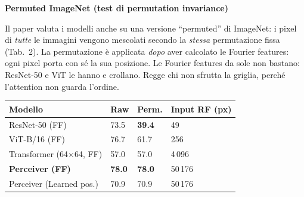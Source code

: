 \documentclass[
  11pt,
]{article}
\begin{document}
\textbf{Permuted ImageNet (test di permutation invariance)}

Il paper valuta i modelli anche su una versione ``permuted'' di ImageNet: i pixel di \emph{tutte} le immagini vengono mescolati secondo la \emph{stessa} permutazione fissa (Tab.\ 2). La permutazione è applicata \emph{dopo} aver calcolato le Fourier features: ogni pixel porta con sé la sua posizione. Le Fourier features da sole non bastano: ResNet-50 e ViT le hanno e crollano. Regge chi non sfrutta la griglia, perché l'attention non guarda l'ordine.

{\small
\begin{longtable}{@{}p{5cm} p{1.8cm} p{1.8cm} p{3cm}@{}}
\toprule
\textbf{Modello} & \textbf{Raw} & \textbf{Perm.} & \textbf{Input RF (px)} \\
\midrule
\endhead
ResNet-50 (FF) & 73.5 & \textbf{39.4} & 49 \\[2pt]
ViT-B/16 (FF) & 76.7 & 61.7 & 256 \\[2pt]
Transformer (64$\times$64, FF) & 57.0 & 57.0 & 4\,096 \\[2pt]
\textbf{Perceiver (FF)} & \textbf{78.0} & \textbf{78.0} & 50\,176 \\[2pt]
Perceiver (Learned pos.) & 70.9 & 70.9 & 50\,176 \\
\bottomrule
\end{longtable}
}
\end{document}
